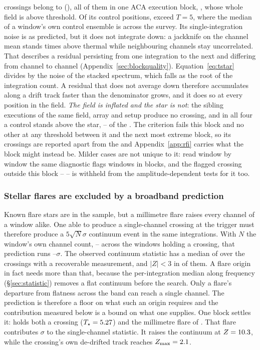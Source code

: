 \BdNCross{} crossings belong to \BdStar{} (\BdAlias), all of them in one ACA
execution block, \texttt{\BdBlock}, whose whole field is above threshold.
Of its \BdNCtrl{} control positions, \BdNCtrlAbove{} exceed $T=5$, where the
median of a window's own control ensemble is \BdSurvCtrlMed{} across the
survey. Its
single-integration noise is as predicted, but it does not integrate down: a
jackknife on the channel mean stands \BdJackRatio{} times above thermal while
neighbouring channels stay uncorrelated. That describes a residual persisting
from one integration to the next and differing from channel to channel
(Appendix~\ref{sec:blockquality}). Equation~\ref{eq:tstar} divides by the noise
of the stacked spectrum, which falls as the root of the integration count. A
residual that does not average down therefore accumulates along a drift track faster than
the denominator grows, and it does so at every position in the field.
\emph{The field is inflated and the star is not}: the \BdNSibling{} sibling
executions of the same field, array and setup produce no crossing, and in
all four a control stands above the star, \EvFlagNgeLo--\EvFlagNgeHi{} of the
\BdNCtrl{}. The criterion fails this block and no other at any threshold between
it and the next most extreme block, so its \BdNCross{} crossings are reported
apart from the \EvNCrossQp{} and Appendix~\ref{app:rfi} carries what the block
might instead be. Milder cases are not unique to it: read window by window the
same diagnostic flags \DqNWin{} windows in \BkFlagNBlock{} blocks, and the
\BkFlagNCrossOther{} flagged crossing outside this block -- \BkFlagOtherStar{}
-- is withheld from the amplitude-dependent tests for it too.

\subsubsection{Stellar flares are excluded by a broadband prediction}

Known flare stars are in the sample, but a millimetre flare raises every
channel of a window alike. One able to produce a single-channel crossing at
the trigger must therefore produce a $5\sqrt{N}\sigma$ continuum event in the
same integrations. With $N$ the window's own channel count,
\FlNChanLo--\FlNChanHi{} across the windows holding a crossing, that prediction
runs \FlPredLo--\FlPredHi$\sigma$. The observed continuum statistic has a
median of \FlObsMed{} over the \FlNCont{} crossings with a recoverable
measurement, and $|Z|<3$ in \FlNQuiet{} of them. A flare origin in fact needs more than
that, because the per-integration median along frequency
(\S\ref{sec:statistic}) removes a flat continuum before the search. Only a
flare's departure from flatness across the band can reach a single channel. The
prediction is therefore a floor on what such an origin requires and the contribution
measured below is a bound on what one supplies. One block settles it:
\FlEgStar{} \texttt{\FlEgEb} holds both a crossing ($T_\star=5.27$) and the
millimetre flare of \citet{MacGregor2020}. That flare contributes
\FlEgContrib$\sigma$ to the single-channel statistic. It raises the continuum
at $Z=10.3$, while the crossing's own de-drifted track reaches
$Z_{\max}=2.1$.

